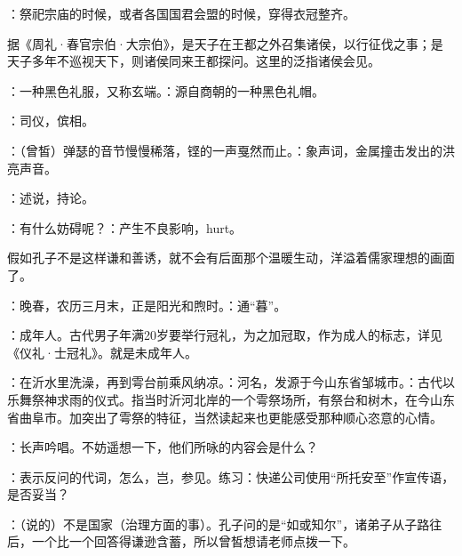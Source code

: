 {\item {}：祭祀宗庙的时候，或者各国国君会盟的时候，穿得衣冠整齐。

据《周礼·春官宗伯·大宗伯》，是天子在王都之外召集诸侯，以行征伐之事；是天子多年不巡视天下，则诸侯同来王都探问。这里的泛指诸侯会见。

：一种黑色礼服，又称玄端。：源自商朝的一种黑色礼帽。

\item {}：司仪，傧相。
\item {}：（曾皙）弹瑟的音节慢慢稀落，铿的一声戛然而止。：象声词，金属撞击发出的洪亮声音。
\item {}：述说，持论。%
\item {}：有什么妨碍呢？：产生不良影响，hurt。

假如孔子不是这样谦和善诱，就不会有后面那个温暖生动，洋溢着儒家理想的画面了。

\item {}：晚春，农历三月末，正是阳光和煦时。：通“暮”。

\item {}：成年人。古代男子年满20岁要举行冠礼，为之加冠取，作为成人的标志，详见《仪礼·士冠礼》。就是未成年人。

\item {}：在沂水里洗澡，再到雩台前乘风纳凉。：河名，发源于今山东省邹城市。：古代以乐舞祭神求雨的仪式。指当时沂河北岸的一个雩祭场所，有祭台和树木，在今山东省曲阜市。加突出了雩祭的特征，当然读起来也更能感受那种顺心恣意的心情。%

\item {}：长声吟唱。不妨遥想一下，他们所咏的内容会是什么？

\item {}：表示反问的代词，怎么，岂，参见。练习：快递公司使用“所托安至”作宣传语，是否妥当？

\item {}：（说的）不是国家（治理方面的事）。孔子问的是“如或知尔”，诸弟子从子路往后，一个比一个回答得谦逊含蓄，所以曾皙想请老师点拨一下。
}
{}



